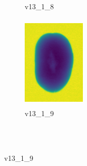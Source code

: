 \documentclass[11pt]{article}
\begin{document}
\begin{figure}
\begin{subfigure}[b]{0.15\textwidth}
        \caption{v13\_1\_8}
         \label{fig:five over x}
     \end{subfigure}
     \hfill
    \begin{subfigure}[b]{0.15\textwidth}
         \centering
         \includegraphics[width=3cm, height=4.5cm]{images/kartofler/v13_1_9_cut.png}
        \caption{v13\_1\_9}
         \label{fig:five over x}
     \end{subfigure} 
     
     
     \\ \\
     

\end{figure}
\end{document}

